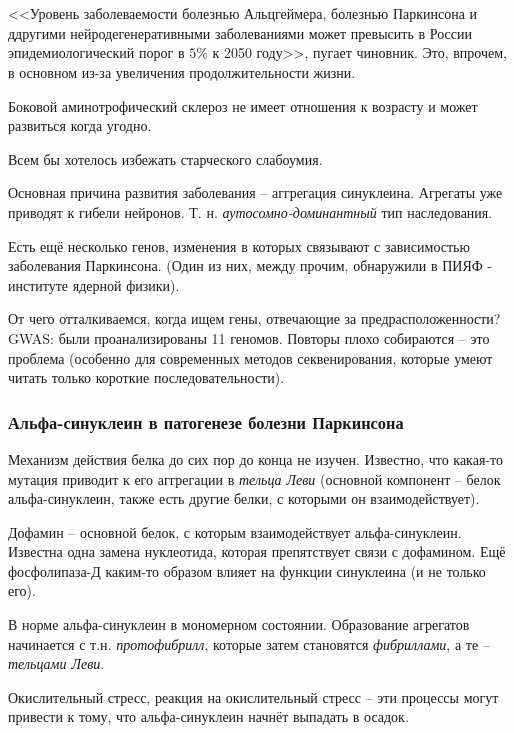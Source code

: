 \documentclass[main.tex]{subfiles}
\begin{document}
\section{}
<<Уровень заболеваемости болезнью Альцгеймера, болезнью Паркинсона и ддругими нейродегенеративными заболеваниями может превысить в России эпидемиологический порог в $5\%$ к 2050 году>>, пугает чиновник.
Это, впрочем, в основном из-за увеличения продолжительности жизни.

Боковой аминотрофический склероз не имеет отношения к возрасту и может развиться когда угодно.

Всем бы хотелось избежать старческого слабоумия.


Основная причина развития заболевания -- аггрегация синуклеина.
Агрегаты уже приводят к гибели нейронов.
Т. н. \emph{аутосомно-доминантный} тип наследования.

Есть ещё несколько генов, изменения в которых связывают с зависимостью заболевания Паркинсона.
(Один из них, между прочим, обнаружили в ПИЯФ - институте ядерной физики).

От чего отталкиваемся, когда ищем гены, отвечающие за предрасположенности?
GWAS: были проанализированы 11 геномов.
Повторы плохо собираются -- это проблема (особенно для современных методов секвенирования, которые умеют читать только короткие последовательности).

\subsubsection{Альфа-синуклеин в патогенезе болезни Паркинсона}

Механизм действия белка до сих пор до конца не изучен.
Известно, что какая-то мутация приводит к его аггрегации в \emph{тельца Леви} (основной компонент -- белок альфа-синуклеин, также есть другие белки, с которыми он взаимодействует).

Дофамин -- основной белок, с которым взаимодействует альфа-синуклеин.
Известна одна замена нуклеотида, которая препятствует связи с дофамином.
Ещё фосфолипаза-Д каким-то образом влияет на функции синуклеина (и не только его).

В норме альфа-синуклеин в мономерном состоянии.
Образование агрегатов начинается с т.н. \emph{протофибрилл}, которые затем становятся \emph{фибриллами}, а те -- \emph{тельцами Леви}.

Окислительный стресс, реакция на окислительный стресс -- эти процессы могут привести к тому, что альфа-синуклеин начнёт выпадать в осадок.
\end{document}
